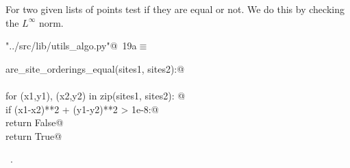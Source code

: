 \documentclass[11.5pt]{report}
\begin{document}
\vspace{-0.8cm}
\newchunk For two given lists of points test if they are 
equal or not. We do this by checking the $L^{\infty}$ norm.
\begin{flushleft} \small
\begin{minipage}{\linewidth}\label{scrap18}\raggedright\small
{} \verb@"../src/lib/utils_algo.py"@\nobreak\ {\footnotesize {19a}}$\equiv$
\vspace{-1ex}
\begin{list}{}{} \item
\mbox{}\verb@def are_site_orderings_equal(sites1, sites2):@\\
\mbox{}\verb@@\\
\mbox{}\verb@    for (x1,y1), (x2,y2) in zip(sites1, sites2): @\\
\mbox{}\verb@        if (x1-x2)**2 + (y1-y2)**2 > 1e-8:@\\
\mbox{}\verb@            return False@\\
\mbox{}\verb@    return True@\\
\mbox{}\verb@@{\NWsep}
\end{list}
\vspace{-1.5ex}
\footnotesize
\begin{list}{}{\setlength{\itemsep}{-\parsep}\setlength{\itemindent}{-\leftmargin}}
\item \NWtxtFileDefBy\ .

\item{}
\end{list}
\end{minipage}\vspace{4ex}
\end{flushleft}
\end{document}
